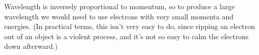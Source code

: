 Wavelength is inversely proportional to momentum, so to produce a large wavelength we
 would need to use electrons with very small momenta and energies. (In practical terms,
 this isn't very easy to do, since ripping an electron out of an object is a violent
 process, and it's not so easy to calm the electrons down afterward.)
